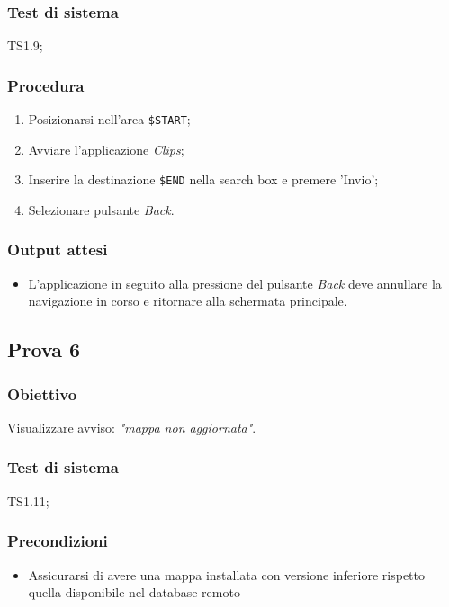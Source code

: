 \documentclass[../Sperimentazione.tex]{subfiles}
\begin{document}
	\subsubsection{Test di sistema}
		TS1.9;
		
	\subsubsection{Procedura}
		\begin{enumerate}
		\item Posizionarsi nell'area  \verb|$START|;
		\item Avviare l'applicazione \textit{Clips};
		\item Inserire la destinazione  \verb|$END| nella search box e premere 'Invio';
		\item Selezionare pulsante \textit{Back}.
		\end{enumerate}
		
	\subsubsection{Output attesi}
		\begin{itemize}
		\item L'applicazione in seguito alla pressione del pulsante \textit{Back} deve annullare la navigazione in corso e ritornare alla schermata principale.
		\end{itemize}	
		
	
	
\newpage
\subsection{Prova 6} %
\label{subsec:Prova6}
	
	\subsubsection{Obiettivo}
		Visualizzare avviso: \textit{"mappa non aggiornata"}.
		
	\subsubsection{Test di sistema}
		TS1.11;
		
	\subsubsection{Precondizioni}
		\begin{itemize}
			\item Assicurarsi di avere una mappa installata con versione inferiore rispetto quella disponibile nel database remoto
		\end{itemize}
	
\end{document}
